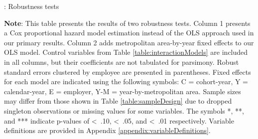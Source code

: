 \documentclass[11pt]{article}
\begin{document}
\clearpage
\begin{table}[!htbp]
    \begin{threeparttable}[b]
        
        \captionsetup{labelfont=bf, singlelinecheck=off, justification=raggedright, labelsep=none}
        \caption{: Robustness tests}  
        
        \raggedright
        \hspace*{-\leftmargin}
        \vspace*{-0.75cm}
        \normalsize

        \noindent
        
        
        \begin{tablenotes}
            \footnotesize
            \item \textbf{Note}: This table presents the results of two robustness tests. Column 1 presents a Cox proportional hazard model estimation instead of the OLS approach used in our primary results. Column 2 adds metropolitan area-by-year fixed effects to our OLS model. Control variables from Table \ref{table:interactionModels} are included in all columns, but their coefficients are not tabulated for parsimony. Robust standard errors clustered by employee are presented in parentheses. Fixed effects for each model are indicated using the following symbols: C = cohort-year, Y = calendar-year, E = employer, Y-M = year-by-metropolitan area. Sample sizes may differ from those shown in Table \ref{table:sampleDesign} due to dropped singleton observations or missing values for some variables. The symbols *, **, and *** indicate p-values of \textless\, .10, \textless\, .05, and \textless\, .01 respectively. Variable definitions are provided in Appendix \ref{appendix:variableDefinitions}.  
        \end{tablenotes}
        \label{table:robustnessModels}
    \end{threeparttable}
\end{table}
\end{document}
